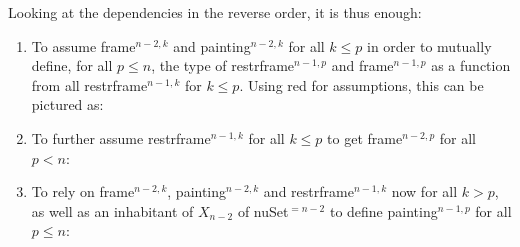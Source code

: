\documentclass[a4paper,english,cleveref,autoref,thm-restate]{article}
\begin{document}
Looking at the dependencies in the reverse order, it is thus enough:
\begin{enumerate}
\item To assume frame$^{n-2,k}$ and painting$^{n-2,k}$ for all $k\leq
  p$ in order to mutually define, for all $p\leq n$, the type of
  restrframe$^{n-1,p}$ and frame$^{n-1,p}$ as a function from all
  restrframe$^{n-1,k}$ for $k\leq p$. Using red for assumptions, this
  can be pictured as:
\begin{center}
\end{center}
\item To further assume restrframe$^{n-1,k}$ for all $k\leq p$ to get
  frame$^{n-2,p}$ for all $p<n$:
\begin{center}
\end{center}

\item To rely on frame$^{n-2,k}$, painting$^{n-2,k}$ and
  restrframe$^{n-1,k}$ now for all $k > p$, as well as an inhabitant
  of $X_{n-2}$ of nuSet$^{=n-2}$ to define painting$^{n-1,p}$ for all
  $p \leq n$:
\begin{center}
\end{center}


\end{enumerate}
\end{document}

